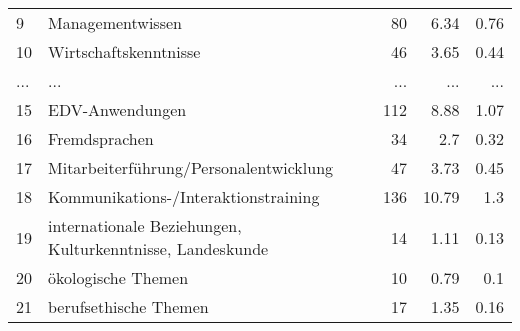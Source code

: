 \begin{longtable}{lXrrr}
        9 & \multicolumn{1}{X}{Managementwissen} & %
          \num{80} &
          \num[round-mode=places,round-precision=2]{6.34} &
          \num[round-mode=places,round-precision=2]{0.76} \\
        10 & \multicolumn{1}{X}{Wirtschaftskenntnisse} & %
          \num{46} &
          \num[round-mode=places,round-precision=2]{3.65} &
          \num[round-mode=places,round-precision=2]{0.44} \\
       ... & ... & ... & ... & ... \\
        15 & \multicolumn{1}{X}{EDV-Anwendungen} & %
          \num{112} &
          \num[round-mode=places,round-precision=2]{8.88} &
          \num[round-mode=places,round-precision=2]{1.07} \\

        16 & \multicolumn{1}{X}{Fremdsprachen} & %
          \num{34} &
          \num[round-mode=places,round-precision=2]{2.7} &
          \num[round-mode=places,round-precision=2]{0.32} \\

        17 & \multicolumn{1}{X}{Mitarbeiterführung/Personalentwicklung} & %
          \num{47} &
          \num[round-mode=places,round-precision=2]{3.73} &
          \num[round-mode=places,round-precision=2]{0.45} \\

        18 & \multicolumn{1}{X}{Kommunikations-/Interaktionstraining} & %
          \num{136} &
          \num[round-mode=places,round-precision=2]{10.79} &
          \num[round-mode=places,round-precision=2]{1.3} \\

        19 & \multicolumn{1}{X}{internationale Beziehungen, Kulturkenntnisse, Landeskunde} & %
          \num{14} &
          \num[round-mode=places,round-precision=2]{1.11} &
          \num[round-mode=places,round-precision=2]{0.13} \\

        20 & \multicolumn{1}{X}{ökologische Themen} & %
          \num{10} &
          \num[round-mode=places,round-precision=2]{0.79} &
          \num[round-mode=places,round-precision=2]{0.1} \\

        21 & \multicolumn{1}{X}{berufsethische Themen} & %
          \num{17} &
          \num[round-mode=places,round-precision=2]{1.35} &
          \num[round-mode=places,round-precision=2]{0.16} \\


\end{longtable}
